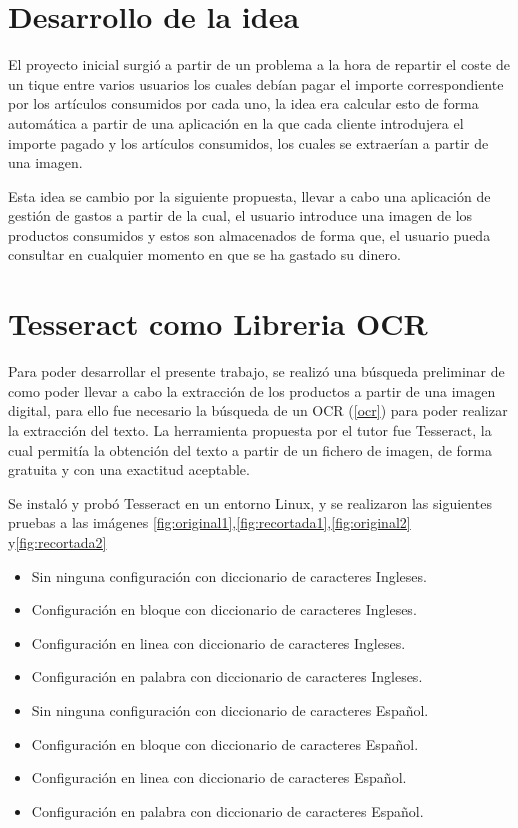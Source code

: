 
\section{Desarrollo de la idea}

El proyecto inicial surgió a partir de un problema a la hora de repartir  el coste de un tique entre varios usuarios los cuales debían pagar el importe correspondiente por los artículos consumidos por cada uno, la idea era calcular esto de forma automática a partir de una aplicación en la que cada cliente introdujera el importe pagado y los artículos consumidos, los cuales se extraerían a partir de una imagen.

Esta idea se cambio por la siguiente propuesta, llevar a cabo una aplicación de gestión de gastos a partir de la cual, el usuario introduce una imagen de los productos consumidos y estos son almacenados de forma que, el usuario pueda consultar en cualquier momento en que se ha gastado su dinero.

\section{Tesseract como Libreria OCR \label{precisionTesseract}}

Para poder desarrollar el presente trabajo, se realizó una búsqueda preliminar de como poder llevar a cabo la extracción de los productos a partir de una imagen digital, para ello fue necesario la búsqueda de un OCR (\ref{ocr}) para poder realizar la  extracción del texto.
La herramienta propuesta por el tutor fue Tesseract, la cual permitía la obtención del texto a partir de un fichero de imagen, de forma gratuita y con una exactitud aceptable.

Se instaló y probó Tesseract en un entorno Linux, y se realizaron las siguientes pruebas a las imágenes \ref{fig:original1},\ref{fig:recortada1},\ref{fig:original2} y\ref{fig:recortada2}

\begin{itemize}
	\item Sin ninguna configuración con diccionario de caracteres Ingleses.
	\item Configuración en bloque con diccionario de caracteres Ingleses.
	\item Configuración en linea con diccionario de caracteres Ingleses.
	
	\item Configuración en palabra con diccionario de caracteres Ingleses.
	
	\item Sin ninguna configuración con diccionario de caracteres Español.
	\item Configuración en bloque con diccionario de caracteres Español.
	\item Configuración en linea con diccionario de caracteres Español.

\item Configuración en palabra con diccionario de caracteres Español.

\end{itemize}

